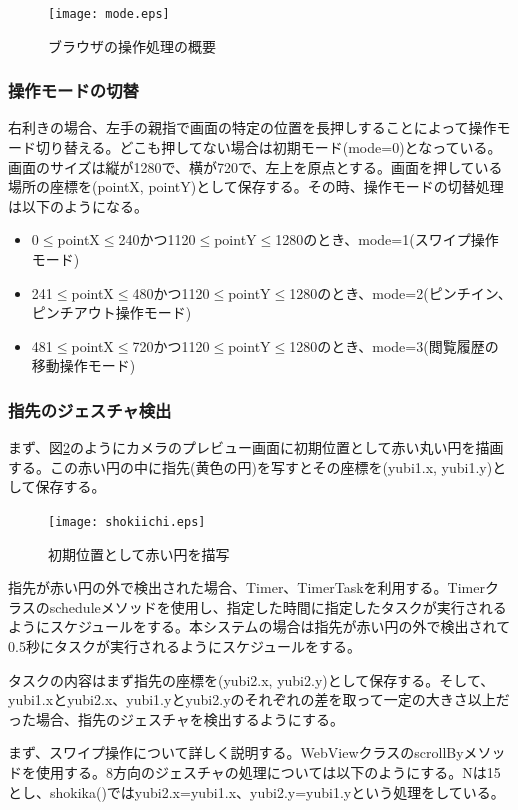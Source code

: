 \documentclass[11pt,a4j, titlepage]{jarticle} %
\begin{document}
\begin{figure}[H]
	\centering
	\texttt{[image: mode.eps]}
	\caption{ブラウザの操作処理の概要}
	\label{fig:f22}
\end{figure}

\subsubsection{操作モードの切替}
右利きの場合、左手の親指で画面の特定の位置を長押しすることによって操作モード切り替える。どこも押してない場合は初期モード(mode=0)となっている。画面のサイズは縦が1280で、横が720で、左上を原点とする。画面を押している場所の座標を(pointX, pointY)として保存する。その時、操作モードの切替処理は以下のようになる。

\begin{itemize}
	\item 0$\le$pointX$\le$240かつ1120$\le$pointY$\le$1280のとき、mode=1(スワイプ操作モード)
	\item 241$\le$pointX$\le$480かつ1120$\le$pointY$\le$1280のとき、mode=2(ピンチイン、ピンチアウト操作モード)
	\item 481$\le$pointX$\le$720かつ1120$\le$pointY$\le$1280のとき、mode=3(閲覧履歴の移動操作モード)
\end{itemize}


\subsubsection{指先のジェスチャ検出}
まず、図\ref{fig:f23}のようにカメラのプレビュー画面に初期位置として赤い丸い円を描画する。この赤い円の中に指先(黄色の円)を写すとその座標を(yubi1.x, yubi1.y)として保存する。

\begin{figure}[H]
	\centering
	\texttt{[image: shokiichi.eps]}
	\caption{初期位置として赤い円を描写}
	\label{fig:f23}
\end{figure}

指先が赤い円の外で検出された場合、Timer、TimerTaskを利用する。Timerクラスのscheduleメソッドを使用し、指定した時間に指定したタスクが実行されるようにスケジュールをする。本システムの場合は指先が赤い円の外で検出されて0.5秒にタスクが実行されるようにスケジュールをする。

タスクの内容はまず指先の座標を(yubi2.x, yubi2.y)として保存する。そして、yubi1.xとyubi2.x、yubi1.yとyubi2.yのそれぞれの差を取って一定の大きさ以上だった場合、指先のジェスチャを検出するようにする。

まず、スワイプ操作について詳しく説明する。WebViewクラスのscrollByメソッドを使用する。8方向のジェスチャの処理については以下のようにする。Nは15とし、shokika()ではyubi2.x=yubi1.x、yubi2.y=yubi1.yという処理をしている。
\end{document}
